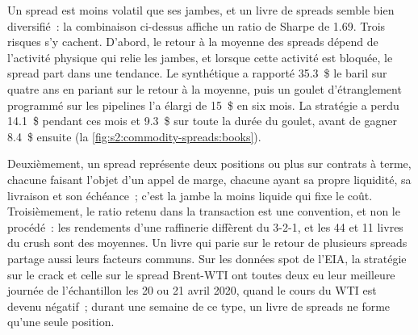 Un spread est moins volatil que ses jambes, et un livre de spreads semble bien diversifié~: la combinaison ci-dessus affiche un ratio de Sharpe de 1.69. Trois risques
s'y cachent. D'abord, le retour à la moyenne des spreads dépend de l'activité physique qui relie les jambes, et lorsque cette activité est bloquée, le spread part dans une tendance.
Le  synthétique a rapporté 35.3~\$ le baril sur quatre ans en pariant sur le retour à la moyenne, puis un goulet d'étranglement programmé sur les pipelines l'a élargi de 15~\$ en six mois.
La stratégie a perdu 14.1~\$ pendant ces mois et 9.3~\$ sur toute la durée du goulet, avant de gagner 8.4~\$ ensuite
(la \cref{fig:s2:commodity-spreads:books}).

Deuxièmement, un spread représente deux positions ou plus sur contrats à terme, chacune faisant l'objet d'un appel de marge, chacune ayant sa propre liquidité, sa livraison et son échéance~; c'est la jambe la moins liquide qui fixe le coût.
Troisièmement, le ratio retenu dans la transaction est une convention, et non le procédé~: les rendements d'une raffinerie diffèrent du 3-2-1, et les 44 et 11 livres du crush sont des moyennes.
Un livre qui parie sur le retour de plusieurs spreads partage aussi leurs facteurs communs. Sur les données spot de l'EIA, la stratégie sur le crack et celle sur le spread Brent-WTI ont toutes deux eu leur meilleure journée
de l'échantillon les 20 ou 21 avril 2020, quand le cours du WTI est devenu négatif~; durant une semaine de ce type, un livre de spreads ne forme qu'une seule position.

\begin{omfigure}

\label{fig:s2:commodity-spreads:books}
\end{omfigure}

